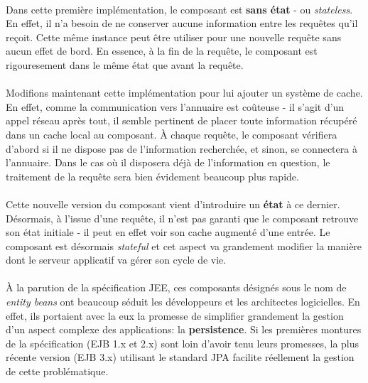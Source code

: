 {  \paragraph{} Dans cette première implémentation, le composant est \textbf{sans état} - ou
  \textit{stateless}. En effet, il n'a besoin de ne conserver aucune information entre les requêtes
  qu'il reçoit. Cette même instance peut être utiliser pour une nouvelle requête sans aucun effet de
  bord. En essence, à la fin de la requête, le composant est rigouresement dans le même état que
  avant la requête.

  \paragraph{} Modifions maintenant cette implémentation pour lui ajouter un système de cache. En
  effet, comme la communication vers l'annuaire est coûteuse - il s'agit d'un appel réseau après
  tout, il semble pertinent de placer toute information récupéré dans un cache local au composant. À
  chaque requête, le composant vérifiera d'abord si il ne dispose pas de l'information recherchée,
  et sinon, se connectera à l'annuaire. Dans le cas où il disposera déjà de l'information en
  question, le traitement de la requête sera bien évidement beaucoup plus rapide.

  \paragraph{} Cette nouvelle version du composant vient d'introduire un \textbf{état} à ce dernier.
  Désormais, à l'issue d'une requête, il n'est pas garanti que le composant retrouve son état
  initiale - il peut en effet voir son cache augmenté d'une entrée. Le composant est désormais
  \textit{stateful} et cet aspect va grandement modifier la manière dont le serveur applicatif va
  gérer son cycle de vie.


  \paragraph{} À la parution de la spécification JEE, ces composants désignés sous le nom de
  \textit{entity beans} ont beaucoup séduit les développeurs et les architectes logicielles. En
  effet, ils portaient avec la eux la promesse de simplifier grandement la gestion d'un aspect
  complexe des applications: la \textbf{persistence}. Si les premières montures de la spécification
  (EJB 1.x et 2.x) sont loin d'avoir tenu leurs promesses, la plus récente version (EJB 3.x)
  utilisant le standard JPA facilite réellement la gestion de cette problématique.

}
